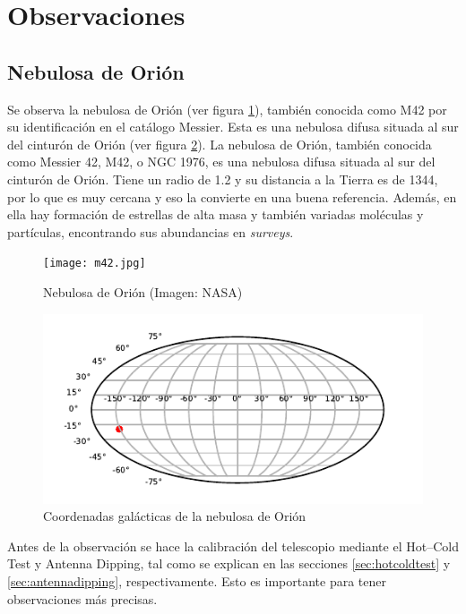 \section{Observaciones}\label{sec:observaciones}

\subsection{Nebulosa de Orión}

Se observa la nebulosa de Orión (ver figura \ref{fig:m42}), también conocida como M42 por su identificación en el catálogo Messier. Esta es una nebulosa difusa situada al sur del cinturón de Orión (ver figura \ref{fig:lb}).
La nebulosa de Orión, también conocida como Messier 42, M42, o NGC 1976, es una nebulosa difusa situada al sur del cinturón de Orión. Tiene un radio de \SI{1.2}{\lightyear} y su distancia a la Tierra es de \SI{1344}{\lightyear}, por lo que es muy cercana y eso la convierte en una buena referencia. Además, en ella hay formación de estrellas de alta masa y también variadas moléculas y partículas, encontrando sus abundancias en \textit{surveys}.

\begin{figure}[p]
	\centering
	\texttt{[image: m42.jpg]}
	\caption{Nebulosa de Orión (Imagen: NASA)}
	\label{fig:m42}
\end{figure}

\begin{figure}[p]
	\centering
	\includegraphics{lb.pdf}
	\caption{Coordenadas galácticas de la nebulosa de Orión}
	\label{fig:lb}
\end{figure}

Antes de la observación se hace la calibración del telescopio mediante el Hot--Cold Test y Antenna Dipping, tal como se explican en las secciones \ref{sec:hotcoldtest} y \ref{sec:antennadipping}, respectivamente. Esto es importante para tener observaciones más precisas.

